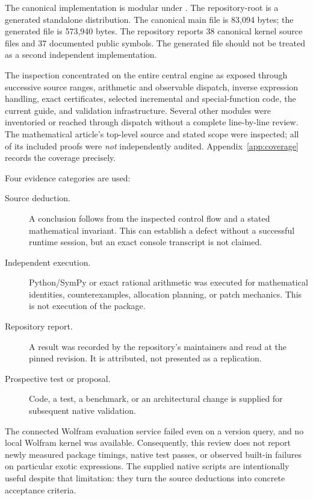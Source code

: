 \documentclass[11pt,a4paper]{article}
\theoremstyle{remark}\newtheorem{remark}[proposition]{Remark}
\begin{document}
The canonical implementation is modular under . The repository-root  is a generated standalone distribution. The canonical main file is 83,094 bytes; the generated file is 573,940 bytes. The repository reports 38 canonical kernel source files and 37 documented public symbols. The generated file should not be treated as a second independent implementation.\cite{tree,development,validation}

The inspection concentrated on the entire central engine as exposed through successive source ranges, arithmetic and observable dispatch, inverse expression handling, exact certificates, selected incremental and special-function code, the current guide, and validation infrastructure. Several other modules were inventoried or reached through dispatch without a complete line-by-line review. The mathematical article's top-level source and stated scope were inspected; all of its included proofs were \emph{not} independently audited. Appendix~\ref{app:coverage} records the coverage precisely.

Four evidence categories are used:
\begin{description}
\item[Source deduction.] A conclusion follows from the inspected control flow and a stated mathematical invariant. This can establish a defect without a successful runtime session, but an exact console transcript is not claimed.
\item[Independent execution.] Python/SymPy or exact rational arithmetic was executed for mathematical identities, counterexamples, allocation planning, or patch mechanics. This is not execution of the package.
\item[Repository report.] A result was recorded by the repository's maintainers and read at the pinned revision. It is attributed, not presented as a replication.
\item[Prospective test or proposal.] Code, a test, a benchmark, or an architectural change is supplied for subsequent native validation.
\end{description}

The connected Wolfram evaluation service failed even on a version query, and no local Wolfram kernel was available. Consequently, this review does not report newly measured package timings, native test passes, or observed built-in failures on particular exotic expressions. The supplied native scripts are intentionally useful despite that limitation: they turn the source deductions into concrete acceptance criteria.
\end{document}

